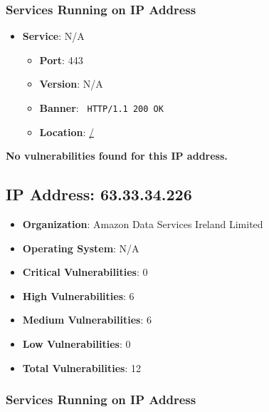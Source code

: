 \documentclass{article}
\begin{document}
\subsubsection*{Services Running on IP Address}

\begin{itemize}
    
        \item \textbf{Service}: N/A
        \begin{itemize}
            \item \textbf{Port}: 443
            \item \textbf{Version}:  N/A 
            \item \textbf{Banner}: \texttt{ HTTP/1.1 200 OK
 }
            \item \textbf{Location}: \href{ / }{ / }
        \end{itemize}
    
\end{itemize}


\textbf{No vulnerabilities found for this IP address.}


\clearpage



\subsection*{IP Address: 63.33.34.226}

\begin{itemize}
    \item \textbf{Organization}: Amazon Data Services Ireland Limited
    \item \textbf{Operating System}:  N/A 
    \item \textbf{Critical Vulnerabilities}: 0
    \item \textbf{High Vulnerabilities}: 6
    \item \textbf{Medium Vulnerabilities}: 6
    \item \textbf{Low Vulnerabilities}: 0
    \item \textbf{Total Vulnerabilities}: 12
\end{itemize}

\subsubsection*{Services Running on IP Address}
\end{document}
